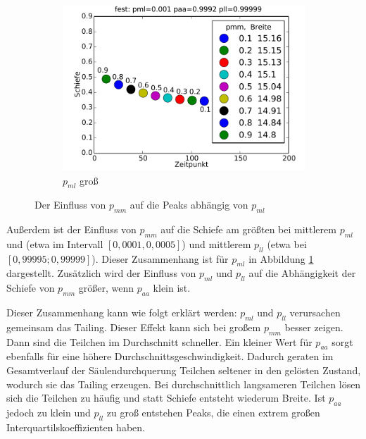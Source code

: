\begin{figure}
\begin{subfigure}{0.6\textwidth}
\includegraphics[width=\textwidth]{bilder/pmm/3fest_p_0001_09992_099999}
\caption{$p_{ml}$ groß}
\end{subfigure}
\caption{Der Einfluss von $p_{mm}$ auf die Peaks abhängig von $p_{ml}$}
\label{einfluss_pmm_2}
\end{figure}

Außerdem ist der Einfluss von $p_{mm}$ auf die Schiefe am größten bei mittlerem $p_{ml}$ und (etwa im Intervall $[0,0001, 0,0005]$) und mittlerem $p_{ll}$ (etwa bei $[0,99995; 0,99999]$). Dieser Zusammenhang ist für $p_{ml}$ in Abbildung \ref{einfluss_pmm_2} dargestellt.
Zusätzlich wird der Einfluss von $p_{ml}$ und $p_{ll}$ auf die Abhängigkeit der Schiefe von $p_{mm}$ größer, wenn $p_{aa}$ klein ist.


Dieser Zusammenhang kann wie folgt erklärt werden: $p_{ml}$ und $p_{ll}$ verursachen gemeinsam das Tailing. Dieser Effekt kann sich bei großem $p_{mm}$ besser zeigen. Dann sind die Teilchen im Durchschnitt schneller. Ein kleiner Wert für $p_{aa}$ sorgt ebenfalls für eine höhere Durchschnittsgeschwindigkeit. Dadurch geraten im Gesamtverlauf der Säulendurchquerung Teilchen seltener in den gelösten Zustand, wodurch sie das Tailing erzeugen. Bei durchschnittlich langsameren Teilchen lösen sich die Teilchen zu häufig und statt Schiefe entsteht wiederum Breite.
Ist $p_{aa}$ jedoch zu klein und $p_{ll}$ zu groß entstehen Peaks, die einen extrem großen Interquartilskoeffizienten haben. %

